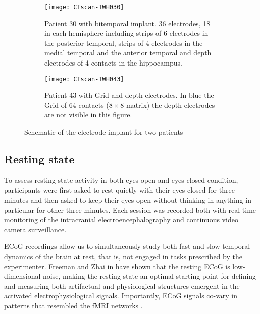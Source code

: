 \documentclass[11pt, onecolumn]{article}
\begin{document}
\begin{figure}[ht] 
  \begin{subfigure}[t]{0.5\linewidth}
    \centering
    \texttt{[image: CTscan-TWH030]} 
    \caption{Patient 30 with bitemporal implant. 36 electrodes, 18 in each hemisphere including strips of 6 electrodes in the posterior temporal, strips of 4 electrodes in the medial temporal and the anterior temporal and depth electrodes of 4 contacts in the hippocampus.} 
    \label{fig0:a} 
    \vspace{4ex}
  \end{subfigure}%
  \hspace{1ex}
  \begin{subfigure}[t]{0.5\linewidth}
    \centering
    \texttt{[image: CTscan-TWH043]} 
    \caption{Patient 43 with Grid and depth electrodes. In blue the Grid of 64 contacts ($8 \times 8$ matrix) the depth electrodes are not visible in this figure.} 
    \label{fig0:b} 
    \vspace{4ex}
  \end{subfigure} 
  \caption{Schematic of the electrode implant for two patients}
  \label{fig0} 
\end{figure}

\subsection{Resting state}
To assess resting-state activity in both eyes open and eyes closed condition, participants were first asked to rest quietly with their eyes closed for three minutes and then asked to keep their eyes open without thinking in anything in particular for other three minutes. Each session was recorded both with real-time monitoring of the intracranial electroencephalography and continuous video camera surveillance.

ECoG recordings allow us to simultaneously study both fast and slow temporal dynamics of the brain at rest, that is, not engaged in tasks prescribed by the experimenter.
Freeman and Zhai in \citep{freeman2009simulated} have shown that the resting ECoG is low-dimensional noise, making the resting state an optimal starting point for defining and measuring both artifactual and physiological structures emergent in the activated electrophysiological signals. Importantly, ECoG signals co-vary in patterns that resembled the fMRI networks \citep{fukushima2015studying}.
\end{document}
